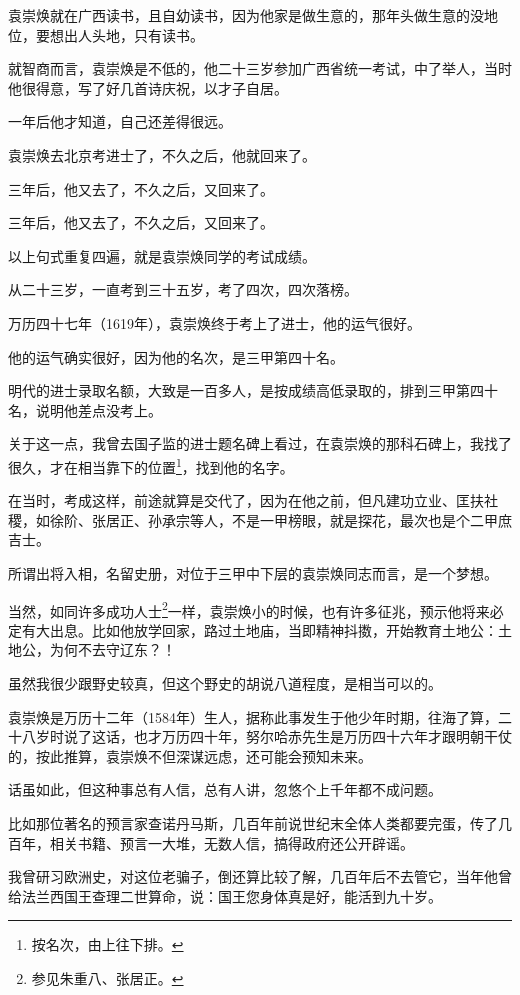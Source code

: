 \begin{multicols}{\theparacolNo}
		袁崇焕就在广西读书，且自幼读书，因为他家是做生意的，那年头做生意的没地位，要想出人头地，只有读书。

		就智商而言，袁崇焕是不低的，他二十三岁参加广西省统一考试，中了举人，当时他很得意，写了好几首诗庆祝，以才子自居。

		一年后他才知道，自己还差得很远。

		袁崇焕去北京考进士了，不久之后，他就回来了。

		三年后，他又去了，不久之后，又回来了。

		三年后，他又去了，不久之后，又回来了。

		以上句式重复四遍，就是袁崇焕同学的考试成绩。

		从二十三岁，一直考到三十五岁，考了四次，四次落榜。

		万历四十七年（1619年），袁崇焕终于考上了进士，他的运气很好。

		他的运气确实很好，因为他的名次，是三甲第四十名。

		明代的进士录取名额，大致是一百多人，是按成绩高低录取的，排到三甲第四十名，说明他差点没考上。

		关于这一点，我曾去国子监的进士题名碑上看过，在袁崇焕的那科石碑上，我找了很久，才在相当靠下的位置\footnote{按名次，由上往下排。}，找到他的名字。

		在当时，考成这样，前途就算是交代了，因为在他之前，但凡建功立业、匡扶社稷，如徐阶、张居正、孙承宗等人，不是一甲榜眼，就是探花，最次也是个二甲庶吉士。

		所谓出将入相，名留史册，对位于三甲中下层的袁崇焕同志而言，是一个梦想。

		当然，如同许多成功人士\footnote{参见朱重八、张居正。}一样，袁崇焕小的时候，也有许多征兆，预示他将来必定有大出息。比如他放学回家，路过土地庙，当即精神抖擞，开始教育土地公：土地公，为何不去守辽东？！

		虽然我很少跟野史较真，但这个野史的胡说八道程度，是相当可以的。

		袁崇焕是万历十二年（1584年）生人，据称此事发生于他少年时期，往海了算，二十八岁时说了这话，也才万历四十年，努尔哈赤先生是万历四十六年才跟明朝干仗的，按此推算，袁崇焕不但深谋远虑，还可能会预知未来。

		话虽如此，但这种事总有人信，总有人讲，忽悠个上千年都不成问题。

		比如那位著名的预言家查诺丹马斯，几百年前说世纪末全体人类都要完蛋，传了几百年，相关书籍、预言一大堆，无数人信，搞得政府还公开辟谣。

		我曾研习欧洲史，对这位老骗子，倒还算比较了解，几百年后不去管它，当年他曾给法兰西国王查理二世算命，说：国王您身体真是好，能活到九十岁。


\end{multicols}
